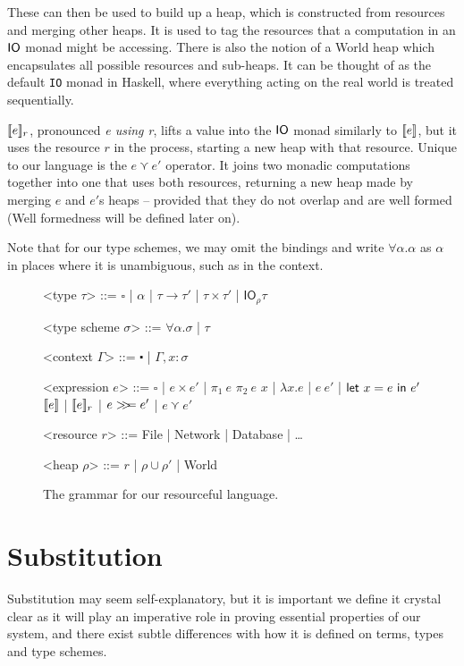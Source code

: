 These can then be used to build up a heap, which is constructed from
resources and merging other heaps. It is used to tag the resources
that a computation in an $\IO$ monad might be accessing. There is also
the notion of a \textsf{World} heap which encapsulates all possible
resources and sub-heaps. It can be thought of as the default
\texttt{IO} monad in Haskell, where everything acting on the real
world is treated sequentially.

$\use{r}{e}$, pronounced \textit{e using r}, lifts a value into the
$\IO$ monad similarly to $\lift{e}$, but it uses the resource $r$ in
the process, starting a new heap with that resource. Unique to our
language is the $e \curlyvee e'$ operator. It joins two monadic computations
together into one that uses both resources, returning a new heap made
by merging $e$ and $e'$s heaps -- provided that they do not overlap and
are well formed (Well formedness will be defined later on).

Note that for our type schemes, we may omit the bindings and write
$\forall \alpha . \alpha$ as $\alpha$ in places where it is unambiguous, such as in the context.

\begin{figure}
\begin{grammar}

  <type $\tau$> ::= $\square$ | $\alpha$ | $\tau \rightarrow \tau'$ | $\tau \times \tau'$ | $\textsf{IO}_\rho \tau$
  
  <type scheme $\sigma$> ::= $\forall \alpha . \sigma$ | $\tau$

  <context $\Gamma$> ::= $\centerdot$ | $\Gamma , x : \sigma$

  <expression $e$> ::= $\square$ | $e \times e'$ | $\pi_1 \ e$ $\pi_2 \ e$
  \alt $x$ | $\lambda x . e$ | $e \ e'$ | $\letin{x = e}{e'}$
  \alt $\lift{e}$ | $\use{r}{e}$ | $e \bind e'$ | $e \curlyvee e'$

  <resource $r$> ::= \textsf{File} | \textsf{Network} |
  \textsf{Database} | \ldots

  <heap $\rho$> ::= $r$ | $\rho \cup \rho'$ | \textsf{World}

\end{grammar}
\caption{The grammar for our resourceful language.} \label{fig:grammar}
\end{figure}

\section{Substitution}
Substitution may seem self-explanatory, but it is important we define
it crystal clear as it will play an imperative role in proving essential
properties of our system, and there exist subtle differences with how it
is defined on terms, types and type schemes.

